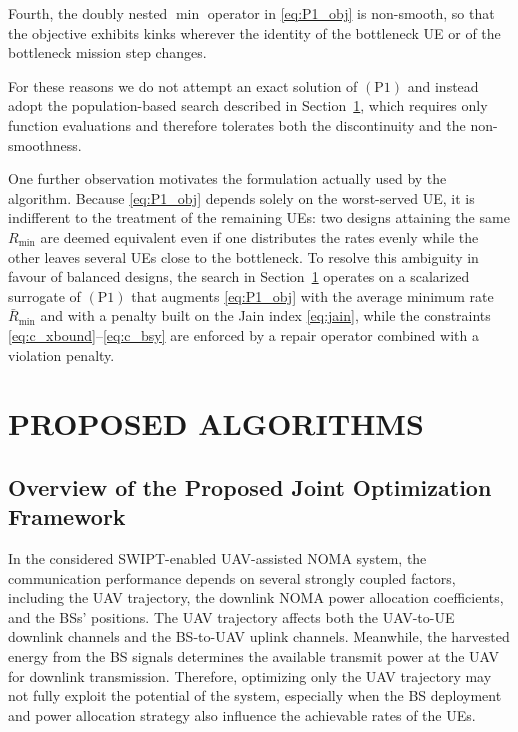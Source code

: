 \documentclass[conference]{IEEEtran}
\begin{document}
Fourth, the doubly nested $\min$ operator in \eqref{eq:P1_obj} is
non-smooth, so that the objective exhibits kinks wherever the identity of
the bottleneck UE or of the bottleneck mission step changes.

For these reasons we do not attempt an exact solution of
$(\mathrm{P1})$ and instead adopt the population-based search described
in Section~\ref{sec:algorithms}, which requires only function
evaluations and therefore tolerates both the discontinuity and the
non-smoothness.

One further observation motivates the formulation actually used by the
algorithm. Because \eqref{eq:P1_obj} depends solely on the worst-served
UE, it is indifferent to the treatment of the remaining UEs: two designs
attaining the same $R_{\min}$ are deemed equivalent even if one
distributes the rates evenly while the other leaves several UEs close to
the bottleneck. To resolve this ambiguity in favour of balanced designs,
the search in Section~\ref{sec:algorithms} operates on a scalarized
surrogate of $(\mathrm{P1})$ that augments \eqref{eq:P1_obj} with the
average minimum rate $\bar{R}_{\min}$ and with a penalty built on the
Jain index \eqref{eq:jain}, while the constraints
\eqref{eq:c_xbound}--\eqref{eq:c_bsy} are enforced by a repair operator
combined with a violation penalty.


\section{PROPOSED ALGORITHMS}
\label{sec:algorithms}

\subsection{Overview of the Proposed Joint Optimization Framework}
\label{subsec:algorithm_overview}
In the considered SWIPT-enabled UAV-assisted NOMA system, the communication performance depends on several strongly coupled factors, including the UAV trajectory, the downlink NOMA power allocation coefficients, and the BSs' positions. The UAV trajectory affects both the UAV-to-UE downlink channels and the BS-to-UAV uplink channels. Meanwhile, the harvested energy from the BS signals determines the available transmit power at the UAV for downlink transmission. Therefore, optimizing only the UAV trajectory may not fully exploit the potential of the system, especially when the BS deployment and power allocation strategy also influence the achievable rates of the UEs.
\end{document}
